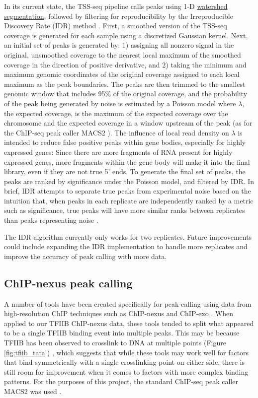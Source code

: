 In its current state, the TSS-seq pipeline calls peaks using 1-D \href{https://en.wikipedia.org/wiki/Watershed_(image_processing)}{watershed segmentation}, followed by filtering for reproducibility by the Irreproducible Discovery Rate (IDR) method \citep{li2011}.
First, a smoothed version of the TSS-seq coverage is generated for each sample using a discretized Gaussian kernel.
Next, an initial set of peaks is generated by: 1) assigning all nonzero signal in the original, unsmoothed coverage to the nearest local maximum of the smoothed coverage in the direction of positive derivative, and 2) taking the minimum and maximum genomic coordinates of the original coverage assigned to each local maximum as the peak boundaries.
The peaks are then trimmed to the smallest genomic window that includes 95\% of the original coverage, and the probability of the peak being generated by noise is estimated by a Poisson model where $\lambda$, the expected coverage, is the maximum of the expected coverage over the chromosome and the expected coverage in a window upstream of the peak (as for the ChIP-seq peak caller MACS2 \citep{zhang2008}).
The influence of local read density on $\lambda$ is intended to reduce false positive peaks within gene bodies, especially for highly expressed genes: Since there are more fragments of RNA present for highly expressed genes, more fragments within the gene body will make it into the final library, even if they are not true 5' ends.
To generate the final set of peaks, the peaks are ranked by significance under the Poisson model, and filtered by IDR.
In brief, IDR attempts to separate true peaks from experimental noise based on the intuition that, when peaks in each replicate are independently ranked by a metric such as significance, true peaks will have more similar ranks between replicates than peaks representing noise \citep{li2011}.

The IDR algorithm currently only works for two replicates.
Future improvements could include expanding the IDR implementation to handle more replicates and improve the accuracy of peak calling with more data.

\subsection{ChIP-nexus peak calling}

A number of tools have been created specifically for peak-calling using data from high-resolution ChIP techniques such as ChIP-nexus and ChIP-exo \citep{wang2014, hansen2016}.
When applied to our TFIIB ChIP-nexus data, these tools tended to split what appeared to be a single TFIIB binding event into multiple peaks.
This may be because TFIIB has been observed to crosslink to DNA at multiple points (Figure \ref{fig:tfiib_tata}) \citep{rhee2012}, which suggests that while these tools may work well for factors that bind symmetrically with a single crosslinking point on either side, there is still room for improvement when it comes to factors with more complex binding patterns.
For the purposes of this project, the standard ChIP-seq peak caller MACS2 was used \citep{zhang2008}.

